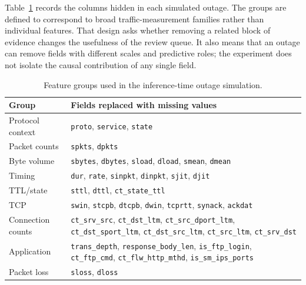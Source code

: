 \documentclass[conference]{IEEEtran}
\begin{document}
Table~\ref{tab:outage_groups} records the columns hidden in each simulated outage. The groups are defined to correspond to broad traffic-measurement families rather than individual features. That design asks whether removing a related block of evidence changes the usefulness of the review queue. It also means that an outage can remove fields with different scales and predictive roles; the experiment does not isolate the causal contribution of any single field.

\begin{table}[t]
\caption{Feature groups used in the inference-time outage simulation.}
\label{tab:outage_groups}
\centering
\small
\begin{tabular}{lp{}}
\toprule
Group & Fields replaced with missing values \\
\midrule
Protocol context & \texttt{proto}, \texttt{service}, \texttt{state} \\
Packet counts & \texttt{spkts}, \texttt{dpkts} \\
Byte volume & \texttt{sbytes}, \texttt{dbytes}, \texttt{sload}, \texttt{dload}, \texttt{smean}, \texttt{dmean} \\
Timing & \texttt{dur}, \texttt{rate}, \texttt{sinpkt}, \texttt{dinpkt}, \texttt{sjit}, \texttt{djit} \\
TTL/state & \texttt{sttl}, \texttt{dttl}, \texttt{ct\_state\_ttl} \\
TCP & \texttt{swin}, \texttt{stcpb}, \texttt{dtcpb}, \texttt{dwin}, \texttt{tcprtt}, \texttt{synack}, \texttt{ackdat} \\
Connection counts & \texttt{ct\_srv\_src}, \texttt{ct\_dst\_ltm}, \texttt{ct\_src\_dport\_ltm}, \texttt{ct\_dst\_sport\_ltm}, \texttt{ct\_dst\_src\_ltm}, \texttt{ct\_src\_ltm}, \texttt{ct\_srv\_dst} \\
Application & \texttt{trans\_depth}, \texttt{response\_body\_len}, \texttt{is\_ftp\_login}, \texttt{ct\_ftp\_cmd}, \texttt{ct\_flw\_http\_mthd}, \texttt{is\_sm\_ips\_ports} \\
Packet loss & \texttt{sloss}, \texttt{dloss} \\
\bottomrule
\end{tabular}
\end{table}
\end{document}
